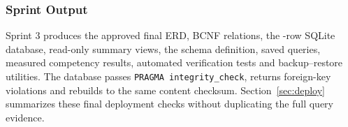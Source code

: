 \subsubsection{Sprint Output}

Sprint 3 produces the approved final ERD, \mBCNFRels{} BCNF relations, the
\mDbRows{}-row SQLite database, \mDbViews{} read-only summary views, the schema
definition, saved queries, measured competency results, automated verification
tests and backup--restore utilities. The database passes
\texttt{PRAGMA integrity\_check}, returns \mDbFkViolations{} foreign-key
violations and rebuilds to the same content checksum. Section~\ref{sec:deploy}
summarizes these final deployment checks without duplicating
the full query evidence.

